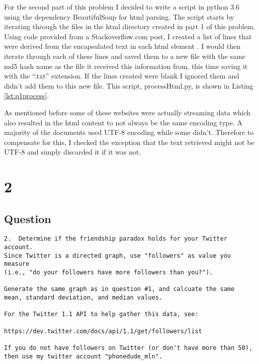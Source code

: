\documentclass[letterpaper,11pt]{article}
\newcommand*{\srcPath}{../src}%
\begin{document}
For the second part of this problem I decided to write a script in python 3.6 using the dependency BeautifulSoup for html parsing. The script starts by iterating through the files in the html directory created in part 1 of this problem. Using code provided from a Stackoverflow.com post, I created a list of lines that were derived from the encapsulated text in each html element \cite{}. I would then iterate through each of these lines and saved them to a new file with the same md5 hash name as the file it received this information from, this time saving it with the ``.txt'' extension. If the lines created were blank I ignored them and didn't add them to this new file. This script, processHtml.py, is shown in Listing \ref{lst:q1process}.

As mentioned before some of these websites were actually streaming data which also resulted in the html content to not always be the same encoding type. A majority of the documents used UTF-8 encoding while some didn't. Therefore to compensate for this, I checked the exception that the text retrieved might not be UTF-8 and simply discarded it if it was not. 




\clearpage


\section*{2}

\subsection*{Question}

\begin{verbatim}
2.  Determine if the friendship paradox holds for your Twitter account.
Since Twitter is a directed graph, use "followers" as value you measure
(i.e., "do your followers have more followers than you?").

Generate the same graph as in question #1, and calcuate the same 
mean, standard deviation, and median values.

For the Twitter 1.1 API to help gather this data, see:

https://dev.twitter.com/docs/api/1.1/get/followers/list

If you do not have followers on Twitter (or don't have more than 50),
then use my twitter account "phonedude_mln".
\end{verbatim}
\end{document}
